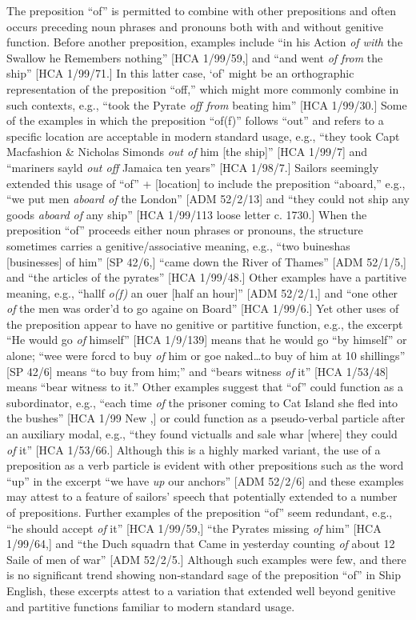 The preposition “of” is permitted to combine with other prepositions and often occurs preceding noun phrases and pronouns both with and without genitive function. Before another preposition, examples include “in his Action \textit{of with} the Swallow he Remembers nothing” [HCA 1/99/59,] and “and went \textit{of from} the ship” [HCA 1/99/71.]  In this latter case, ‘of’ might be an orthographic representation of the preposition “off,” which might more commonly combine in such contexts, e.g., “took the Pyrate \textit{off from} beating him” [HCA 1/99/30.] Some of the examples in which the preposition “of(f)” follows “out” and refers to a specific location are acceptable in modern standard usage, e.g., “they took Capt Macfashion \& Nicholas Simonds \textit{out of} him [the ship]” [HCA 1/99/7] and “mariners sayld \textit{out off} Jamaica ten years” [HCA 1/98/7.] Sailors seemingly extended this usage of “of” + [location] to include the preposition “aboard,” e.g., “we put men \textit{aboard of} the London” [ADM 52/2/13] and “they could not ship any goods \textit{aboard of} any ship” [HCA 1/99/113 loose letter c. 1730.] When the preposition “of” proceeds either noun phrases or pronouns, the structure sometimes carries a genitive/associative meaning, e.g., “two buineshas [businesses] of him” [SP 42/6,] “came down the River of Thames” [ADM 52/1/5,] and “the articles of the pyrates” [HCA 1/99/48.] Other examples have a partitive meaning, e.g., “hallf \textit{o(f)} an ouer [half an hour]” [ADM 52/2/1,] and “one other \textit{of} the men was order’d to go againe on Board” [HCA 1/99/6.] Yet other uses of the preposition appear to have no genitive or partitive function, e.g., the excerpt “He would go \textit{of} himself” [HCA 1/9/139] means that he would go “by himself” or alone; “wee were forcd to buy \textit{of} him or goe naked…to buy of him at 10 shillings” [SP 42/6] means “to buy from him;” and “bears witness \textit{of} it” [HCA 1/53/48] means “bear witness to it.” Other examples suggest that “of” could function as a subordinator, e.g., “each time \textit{of} the prisoner coming to Cat Island she fled into the bushes” [HCA 1/99 New \citealt{Providence1722},] or could function as a pseudo-verbal particle after an auxiliary modal, e.g., “they found victualls and sale whar [where] they could \textit{of} it” [HCA 1/53/66.] Although this is a highly marked variant, the use of a preposition as a verb particle is evident with other prepositions such as the word “up” in the excerpt “we have \textit{up} our anchors” [ADM 52/2/6] and these examples may attest to a feature of sailors’ speech that potentially extended to a number of prepositions. Further examples of the preposition “of” seem redundant, e.g., “he should accept \textit{of} it” [HCA 1/99/59,] “the Pyrates missing \textit{of} him” [HCA 1/99/64,] and “the Duch squadrn that Came in yesterday counting \textit{of} about 12 Saile of men of war” [ADM 52/2/5.] Although such examples were few, and there is no significant trend showing non-standard sage of the preposition “of” in Ship English, these excerpts attest to a variation that extended well beyond genitive and partitive functions familiar to modern standard usage. 

